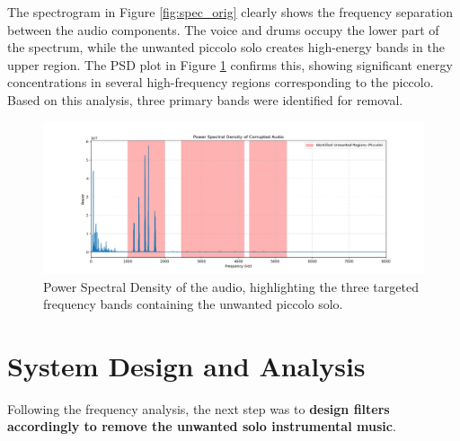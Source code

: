 \documentclass[11pt, a4paper]{article}
\begin{document}
The spectrogram in Figure \ref{fig:spec_orig} clearly shows the frequency separation between the audio components. The voice and drums occupy the lower part of the spectrum, while the unwanted piccolo solo creates high-energy bands in the upper region. The PSD plot in Figure \ref{fig:psd} confirms this, showing significant energy concentrations in several high-frequency regions corresponding to the piccolo. Based on this analysis, three primary bands were identified for removal.

\begin{figure}[H]
    \centering
    \includegraphics[width=\textwidth]{q2_part1b_psd_analysis.png}
    \caption{Power Spectral Density of the audio, highlighting the three targeted frequency bands containing the unwanted piccolo solo.}
    \label{fig:psd}
\end{figure}

\section{System Design and Analysis}
Following the frequency analysis, the next step was to \textbf{design filters accordingly to remove the unwanted solo instrumental music}. 
\end{document}
